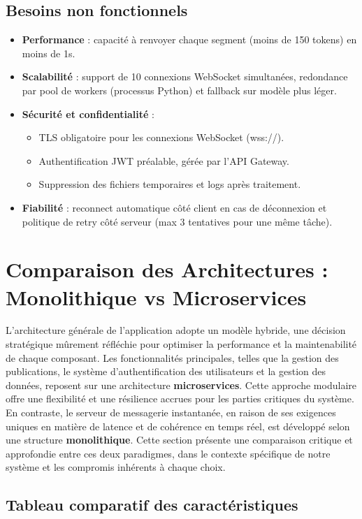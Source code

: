 \documentclass[12pt]{rapportPfe}
\begin{document}
\subsection{Besoins non fonctionnels}
\begin{itemize}[itemsep=0.8em]
  \item \textbf{Performance} : capacité à renvoyer chaque segment (moins de 150 tokens) en moins de 1s.
  \item \textbf{Scalabilité} : support de 10 connexions WebSocket simultanées, redondance par pool de workers (processus Python) et fallback sur modèle plus léger.
  \item \textbf{Sécurité et confidentialité} :
    \begin{itemize}
      \item TLS obligatoire pour les connexions WebSocket (wss://).
      \item Authentification JWT préalable, gérée par l’API Gateway.
      \item Suppression des fichiers temporaires et logs après traitement.
    \end{itemize}
  \item \textbf{Fiabilité} : reconnect automatique côté client en cas de déconnexion et politique de retry côté serveur (max 3 tentatives pour une même tâche).
\end{itemize}
\section{Comparaison des Architectures : Monolithique vs Microservices}

L'architecture générale de l'application adopte un modèle hybride, une décision stratégique mûrement réfléchie pour optimiser la performance et la maintenabilité de chaque composant. Les fonctionnalités principales, telles que la gestion des publications, le système d'authentification des utilisateurs et la gestion des données, reposent sur une architecture \textbf{microservices}. Cette approche modulaire offre une flexibilité et une résilience accrues pour les parties critiques du système. En contraste, le serveur de messagerie instantanée, en raison de ses exigences uniques en matière de latence et de cohérence en temps réel, est développé selon une structure \textbf{monolithique}. Cette section présente une comparaison critique et approfondie entre ces deux paradigmes, dans le contexte spécifique de notre système et les compromis inhérents à chaque choix.

\subsection{Tableau comparatif des caractéristiques}
\end{document}
